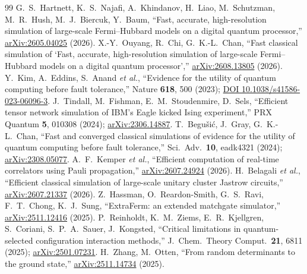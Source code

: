 \begin{thebibliography}{99}
 G.~S.~Hartnett, K.~S.~Najafi, A.~Khindanov, H.~Liao, M.~Schutzman, M.~R.~Hush, M.~J.~Biercuk, Y.~Baum, ``Fast, accurate, high-resolution simulation of large-scale Fermi--Hubbard models on a digital quantum processor,'' \href{https://arxiv.org/abs/2605.04025}{arXiv:2605.04025} (2026).
 X.-Y.~Ouyang, R.~Chi, G.~K.-L.~Chan, ``Fast classical simulation of `Fast, accurate, high-resolution simulation of large-scale Fermi--Hubbard models on a digital quantum processor','' \href{https://arxiv.org/abs/2608.13805}{arXiv:2608.13805} (2026).
 Y.~Kim, A.~Eddins, S.~Anand \emph{et al.}, ``Evidence for the utility of quantum computing before fault tolerance,'' Nature \textbf{618}, 500 (2023); \href{https://doi.org/10.1038/s41586-023-06096-3}{DOI 10.1038/s41586-023-06096-3}.
 J.~Tindall, M.~Fishman, E.~M.~Stoudenmire, D.~Sels, ``Efficient tensor network simulation of IBM's Eagle kicked Ising experiment,'' PRX Quantum \textbf{5}, 010308 (2024); \href{https://arxiv.org/abs/2306.14887}{arXiv:2306.14887}.
 T.~Begu\v{s}i\'c, J.~Gray, G.~K.-L.~Chan, ``Fast and converged classical simulations of evidence for the utility of quantum computing before fault tolerance,'' Sci.\ Adv.\ \textbf{10}, eadk4321 (2024); \href{https://arxiv.org/abs/2308.05077}{arXiv:2308.05077}.
 A.~F.~Kemper \emph{et al.}, ``Efficient computation of real-time correlators using Pauli propagation,'' \href{https://arxiv.org/abs/2607.24924}{arXiv:2607.24924} (2026).
 H.~Belagali \emph{et al.}, ``Efficient classical simulation of large-scale unitary cluster Jastrow circuits,'' \href{https://arxiv.org/abs/2607.21337}{arXiv:2607.21337} (2026).
 Z.~Hassman, O.~Reardon-Smith, G.~S.~Ravi, F.~T.~Chong, K.~J.~Sung, ``ExtraFerm: an extended matchgate simulator,'' \href{https://arxiv.org/abs/2511.12416}{arXiv:2511.12416} (2025).
 P.~Reinholdt, K.~M.~Ziems, E.~R.~Kjellgren, S.~Coriani, S.~P.~A.~Sauer, J.~Kongsted, ``Critical limitations in quantum-selected configuration interaction methods,'' J.\ Chem.\ Theory Comput.\ \textbf{21}, 6811 (2025); \href{https://arxiv.org/abs/2501.07231}{arXiv:2501.07231}.
 H.~Zhang, M.~Otten, ``From random determinants to the ground state,'' \href{https://arxiv.org/abs/2511.14734}{arXiv:2511.14734} (2025).

\end{thebibliography}
